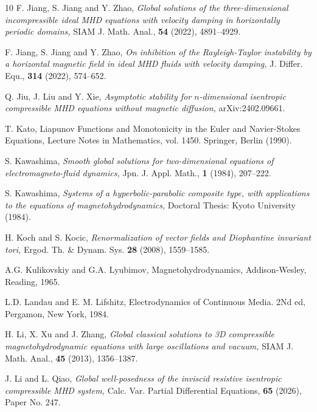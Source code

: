 \documentclass[12pt, reqno]{amsart}
\numberwithin{equation}{section}
\numberwithin{equation}{section}
\numberwithin{equation}{section}
\numberwithin{equation}{section}
\theoremstyle{remark}
\begin{document}
\begin{thebibliography}{10}
 F. Jiang,  S. Jiang and Y. Zhao, {\it Global solutions of the three-dimensional incompressible ideal MHD equations with velocity damping in horizontally periodic domains,} SIAM J. Math. Anal., {\bf54} (2022), 4891--4929.


 F. Jiang,  S. Jiang and Y. Zhao, {\it On inhibition of the Rayleigh-Taylor instability by a horizontal magnetic field in ideal MHD fluids with velocity damping,} J. Differ. Equ., {\bf314} (2022), 574--652.

 Q. Jiu, J. Liu and Y. Xie, {\it Asymptotic stability for $n$-dimensional isentropic compressible MHD equations without magnetic diffusion,} arXiv:2402.09661.


	T. Kato, Liapunov Functions and Monotonicity in the Euler and Navier-Stokes Equations, Lecture Notes
	in Mathematics, vol. 1450. Springer, Berlin (1990).


S. Kawashima,  {\it Smooth global solutions for two-dimensional equations of electromagneto-fluid dynamics,} Jpn. J. Appl. Math., {\bf1} (1984), 207--222.

 S. Kawashima,  {\it Systems of a hyperbolic-parabolic composite type, with applications to the equations of magnetohydrodynamics,} Doctoral Thesis: Kyoto University (1984).

  H. Koch and S. Kocic, {\it  Renormalization of vector fields and
   Diophantine invariant tori,}  Ergod. Th. \& Dynam. Sys. {\bf 28} (2008),
   1559--1585.


 A.G. Kulikovskiy and  G.A. Lyubimov, Magnetohydrodynamics, Addison-Wesley, Reading, 1965.


L.D. Landau and  E. M.  Lifshitz, Electrodynamics of Continuous Media. 2Nd ed, Pergamon, New York, 1984.

 H. Li, X. Xu and J. Zhang, {\it Global classical solutions to 3D compressible magnetohydrodynamic equations with large oscillations and vacuum,} SIAM J. Math. Anal., {\bf45} (2013), 1356--1387.

	J. Li and L. Qiao,  {\it Global well-posedness of the inviscid resistive isentropic
compressible MHD system,} Calc. Var. Partial Differential Equations, {\bf 65} (2026), Paper No. 247.


\end{thebibliography}
\end{document}
